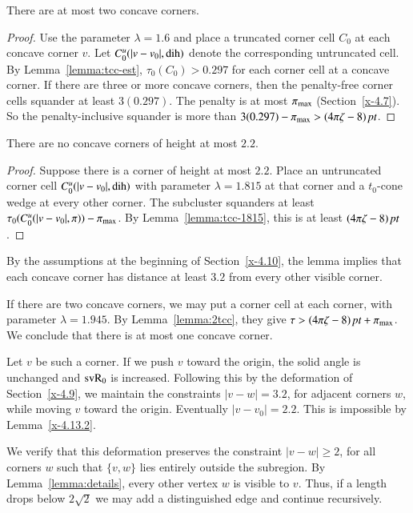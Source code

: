 \begin{lemma}
There are at most two concave corners.
\end{lemma}

\begin{proof}
Use the parameter $\lambda=1.6$ and place a truncated corner cell $C_0$
at each concave corner $v$. Let $C_0^u(|v-v_0|,\operatorname{dih})$ denote the
corresponding untruncated cell.  By Lemma~\ref{lemma:tcc-est},
$\tau_0(C_0) > 0.297$ for each corner cell at a concave corner.
If there are three or more concave corners, then the penalty-free corner
cells squander at least $3(0.297)$. The penalty is at most $\pi_{\max}$
(Section~\ref{x-4.7}). So the penalty-inclusive squander is more than
    $3(0.297) - \pi_{\max} >(4\pi\zeta-8)\,\hbox{\it pt}$.
\end{proof}

\begin{lemma}
There are no concave corners of height at most $2.2$.
\end{lemma}

\begin{proof}
Suppose there is a corner of height at most $2.2$. Place an
untruncated corner cell $C^u_0(|v-v_0|,\operatorname{dih})$ with parameter $\lambda
=1.815$ at that corner and a $t_0$-cone wedge at every other corner. 
The
subcluster squanders at least
    $\tau_0(C^u_0(|v-v_0|,\pi))-\pi_{\max}$.
By Lemma~\ref{lemma:tcc-1815}, this is at least $(4\pi\zeta-8)\,\hbox{\it pt}$.
\end{proof}

By the assumptions at the beginning of Section~\ref{x-4.10}, the lemma
implies that each concave corner has distance at least $3.2$ from every
other visible corner.

If there are two concave corners, we may put a corner cell at
each corner, with parameter $\lambda=1.945$.  By Lemma~\ref{lemma:2tcc},
they give $\tau > (4\pi\zeta-8)\,\hbox{\it pt} + \pi_{\max}$.
We conclude that there is at most one concave corner. 

Let $v$ be such a
corner.   
If we push $v$ toward the origin, the solid angle is unchanged
and ${\operatorname{svR}}_0$ is increased.  Following this by the deformation of
Section~\ref{x-4.9}, we maintain the constraints $|v-w|=3.2$, for
adjacent corners $w$, while moving $v$ toward the origin. Eventually
$|v-v_0|=2.2$. This is impossible by Lemma~\ref{x-4.13.2}.

We verify that this deformation preserves the constraint
$|v-w|\ge2$, for all corners $w$ such that $\{v,w\}$ lies entirely
outside the subregion.  
By Lemma~\ref{lemma:details}, every other vertex $w$
is visible to $v$.  Thus, if a length drops below $2\sqrt2$ we may
add a distinguished edge and continue recursively.

